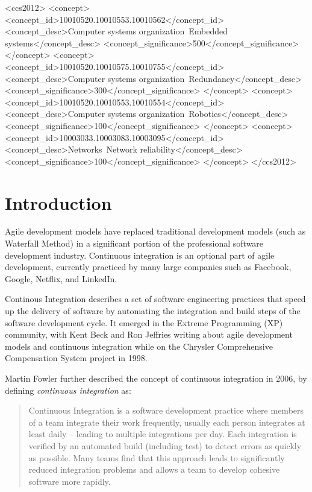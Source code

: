 \documentclass{sig-alternate}
\begin{document}
\begin{CCSXML}
<ccs2012>
 <concept>
  <concept_id>10010520.10010553.10010562</concept_id>
  <concept_desc>Computer systems organization~Embedded systems</concept_desc>
  <concept_significance>500</concept_significance>
 </concept>
 <concept>
  <concept_id>10010520.10010575.10010755</concept_id>
  <concept_desc>Computer systems organization~Redundancy</concept_desc>
  <concept_significance>300</concept_significance>
 </concept>
 <concept>
  <concept_id>10010520.10010553.10010554</concept_id>
  <concept_desc>Computer systems organization~Robotics</concept_desc>
  <concept_significance>100</concept_significance>
 </concept>
 <concept>
  <concept_id>10003033.10003083.10003095</concept_id>
  <concept_desc>Networks~Network reliability</concept_desc>
  <concept_significance>100</concept_significance>
 </concept>
</ccs2012>  
\end{CCSXML}



\section{Introduction}
Agile development models have replaced traditional development models (such as Waterfall Method) in a significant portion of the professional software development industry. Continuous integration is an optional part of agile development, currently practiced by many large companies such as Facebook, Google, Netflix, and LinkedIn.

Continous Integration describes a set of software engineering practices that speed up the delivery of software by automating the integration and build steps of the software development cycle. It emerged in the Extreme Programming (XP) community, with Kent Beck and Ron Jeffries writing about agile development models and continuous integration while on the Chrysler Comprehensive Compensation System project in 1998\cite{beck:extreme_programming}\cite{beck:agile_manifesto}.

Martin Fowler further described the concept of continuous integration in 2006, by defining \textit{continuous integration} as:
\begin{quote}
Continuous Integration is a software development practice where members of a team integrate their work frequently, usually each person integrates at least daily -- leading to multiple integrations per day. Each integration is verified by an automated build (including test) to detect errors as quickly as possible. Many teams find that this approach leads to significantly reduced integration problems and allows a team to develop cohesive software more rapidly.\cite{fowler:continuous}
\end{quote}
\end{document}
